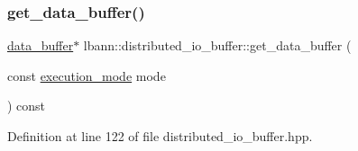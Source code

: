 \subsubsection{\texorpdfstring{get\+\_\+data\+\_\+buffer()}{get\_data\_buffer()}}
{\footnotesize\ttfamily \hyperlink{classlbann_1_1data__buffer}{data\+\_\+buffer}$\ast$ lbann\+::distributed\+\_\+io\+\_\+buffer\+::get\+\_\+data\+\_\+buffer (\begin{DoxyParamCaption}\item[{const \hyperlink{base_8hpp_a2781a159088df64ed7d47cc91c4dc0a8}{execution\+\_\+mode}}]{mode }\end{DoxyParamCaption}) const\hspace{0.3cm}{\ttfamily [inline]}}



Definition at line 122 of file distributed\+\_\+io\+\_\+buffer.\+hpp.


